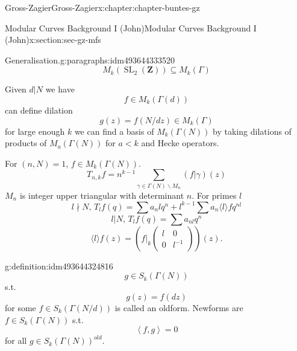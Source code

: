 \documentclass[oneside,10pt,]{book}
\numberwithin{equation}{section}
\newcommand{\inv}{^{-1}}
\newcommand{\pair}[2]{\left\langle #1, #2 \right\rangle}
\newcommand{\ZZ}{\mathbf{Z}}
\DeclareMathOperator{\SL}{SL}
\newcommand{\lt}{<}
\newcommand{\amp}{&}
\begin{document}
\begin{chapterptx}{Gross-Zagier}{}{Gross-Zagier}{}{}{x:chapter:chapter-buntes-gz}
\begin{sectionptx}{Modular Curves Background I (John)}{}{Modular Curves Background I (John)}{}{}{x:section:sec-gz-mfs}
\begin{paragraphs}{Generalisation.}{g:paragraphs:idm493644333520}
\begin{equation*}
\end{equation*}
%
\begin{equation*}
M_k(\SL_2(\ZZ)) \subseteq M_k(\Gamma )
\end{equation*}
%
\par
Given \(d|N\) we have%
\begin{equation*}
f \in M_k(\Gamma (d))
\end{equation*}
can define dilation%
\begin{equation*}
g(z) = f(N/d z) \in M_k(\Gamma )
\end{equation*}
for large enough \(k\) we can find a basis of \(M_k(\Gamma (N))\) by taking dilations of products of \(M_a(\Gamma (N))\) for \(a \lt k\) and Hecke operators.%
\par
For \((n,N) = 1\), \(f\in M_k(\Gamma (N))\).%
\begin{equation*}
T_{n,k} f = n^{k-1} \sum_{\gamma \in \Gamma (N) \backslash M_n} (f|\gamma )(z)
\end{equation*}
\(M_n\) is integer upper triangular with determinant \(n\). For primes \(l\)%
\begin{equation*}
l\nmid N,\, T_l f(q) = \sum a_n l q^n + l^{k-1} \sum a_n \langle l \rangle f q^{nl}
\end{equation*}
%
\begin{equation*}
l | N,\, T_lf(q) = \sum a_{nl} q^n
\end{equation*}
%
\begin{equation*}
\langle l \rangle f(z) = \left(f|_k \begin{pmatrix} l \amp 0 \\ 0 \amp l\inv \end{pmatrix}\right) (z)\text{.}
\end{equation*}
%
\begin{definition}{}{g:definition:idm493644324816}%
%
\begin{equation*}
g \in S_k(\Gamma (N))
\end{equation*}
s.t.%
\begin{equation*}
g(z) = f(d z)
\end{equation*}
for some \(f \in S_k(\Gamma (N/d))\) is called an oldform. Newforms are \(f\in S_k(\Gamma (N))\) s.t.%
\begin{equation*}
\pair fg = 0
\end{equation*}
for all \(g\in S_k(\Gamma (N))^{old}\).%
\end{definition}
\end{paragraphs}%
\end{sectionptx}

\end{chapterptx}
\end{document}
